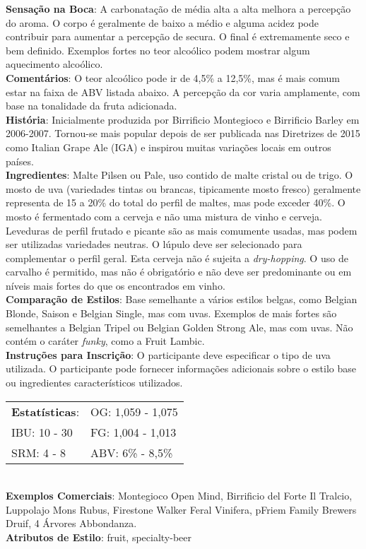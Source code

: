 \textbf{Sensação na Boca}: A carbonatação de média alta a alta melhora a percepção do aroma. O corpo é geralmente de baixo a médio e alguma acidez pode contribuir para aumentar a percepção de secura. O final é extremamente seco e bem definido. Exemplos fortes no teor alcoólico podem mostrar algum aquecimento alcoólico. \\
\textbf{Comentários}: O teor alcoólico pode ir de 4,5\% a 12,5\%, mas é mais comum estar na faixa de ABV listada abaixo. A percepção da cor varia amplamente, com base na tonalidade da fruta adicionada. \\
\textbf{História}: Inicialmente produzida por Birrificio Montegioco e Birrificio Barley em 2006-2007. Tornou-se mais popular depois de ser publicada nas Diretrizes de 2015 como Italian Grape Ale (IGA) e inspirou muitas variações locais em outros países. \\
\textbf{Ingredientes}: Malte Pilsen ou Pale, uso contido de malte cristal ou de trigo. O mosto de uva (variedades tintas ou brancas, tipicamente mosto fresco) geralmente representa de 15 a 20\% do total do perfil de maltes, mas pode exceder 40\%. O mosto é fermentado com a cerveja e não uma mistura de vinho e cerveja. Leveduras de perfil frutado e picante são as mais comumente usadas, mas podem ser utilizadas variedades neutras. O lúpulo deve ser selecionado para complementar o perfil geral. Esta cerveja não é sujeita a \textit{dry-hopping}. O uso de carvalho é permitido, mas não é obrigatório e não deve ser predominante ou em níveis mais fortes do que os encontrados em vinho. \\
\textbf{Comparação de Estilos}: Base semelhante a vários estilos belgas, como Belgian Blonde, Saison e Belgian Single, mas com uvas. Exemplos de mais fortes são semelhantes a Belgian Tripel ou Belgian Golden Strong Ale, mas com uvas. Não contém o caráter \textit{funky}, como a Fruit Lambic. \\
\textbf{Instruções para Inscrição}: O participante deve especificar o tipo de uva utilizada. O participante pode fornecer informações adicionais sobre o estilo base ou ingredientes característicos utilizados. \\
\begin{tabular}{@{}p{35mm}p{35mm}@{}}
  \textbf{Estatísticas}: & OG: 1,059 - 1,075 \\
  IBU: 10 - 30  & FG: 1,004 - 1,013  \\
  SRM: 4 - 8  & ABV: 6\% - 8,5\%
\end{tabular}\\
\textbf{Exemplos Comerciais}: Montegioco Open Mind, Birrificio del Forte Il Tralcio, Luppolajo Mons Rubus, Firestone Walker Feral Vinifera, pFriem Family Brewers Druif, 4 Árvores Abbondanza. \\
\textbf{Atributos de Estilo}: fruit, specialty-beer
